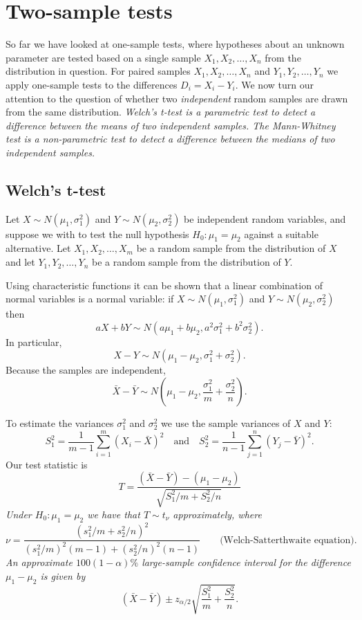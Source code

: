 
\section{Two-sample tests}\label{sec:two-sample-tests}

So far we have looked at one-sample tests, where hypotheses about an unknown parameter are tested based on a single sample $X_1,X_2,\ldots,X_n$ from the distribution in question. For paired samples $X_1,X_2,\ldots,X_n$ and $Y_1,Y_2,\ldots,Y_n$ we apply one-sample tests to the differences $D_i=X_i-Y_i$. We now turn our attention to the question of whether two \emph{independent} random samples are drawn from the same distribution.
\bit
\it \emph{Welch's t-test} is a parametric test to detect a difference between the means of two independent samples.
\it The \emph{Mann-Whitney test} is a non-parametric test to detect a difference between the medians of two independent samples.
\eit
\subsection{Welch's t-test}
Let $X\sim N(\mu_1,\sigma_1^2)$ and $Y\sim N(\mu_2,\sigma_2^2)$ be independent random variables, and suppose we with to test the null hypothesis $H_0:\mu_1=\mu_2$ against a suitable alternative. Let $X_1,X_2,\ldots,X_m$ be a random sample from the distribution of $X$ and let $Y_1,Y_2,\ldots,Y_n$ be a random sample from the distribution of $Y$. 

Using characteristic functions it can be shown that a linear combination of normal variables is a normal variable: if $X\sim N(\mu_1,\sigma_1^2)$ and $Y\sim N(\mu_2,\sigma^2_2)$ then
\[
aX+bY\sim N(a\mu_1+b\mu_2, a^2\sigma_1^2 + b^2\sigma_2^2).
\]
In particular,
\[
X-Y\sim N(\mu_1-\mu_2, \sigma_1^2 + \sigma_2^2).
\]
Because the samples are independent,
\[
\bar{X} - \bar{Y} \sim N\left(\mu_1-\mu_2, \frac{\sigma_1^2}{m} + \frac{\sigma_2^2}{n}\right).
\]

To estimate the variances $\sigma_1^2$ and $\sigma_2^2$ we use the sample variances of $X$ and $Y$:
\[
S_1^2 = \displaystyle\frac{1}{m-1}\sum_{i=1}^m (X_i-\bar{X})^2
\quad\text{and}\quad
S_2^2 = \displaystyle\frac{1}{n-1}\sum_{j=1}^n (Y_j-\bar{Y})^2.
\]
Our test statistic is
\[
T = \frac{(\bar{X}-\bar{Y})-(\mu_1-\mu_2)}{\sqrt{S_1^2/m + S_2^2/n}} %
\]
\bit
\it Under $H_0:\mu_1=\mu_2$ we have that $T\sim t_{\nu}$ approximately, where
\[
\nu = \frac{(s_1^2/m+s_2^2/n)^2}{(s_1^2/m)^2(m-1) + (s_2^2/n)^2(n-1)} \qquad\text{(Welch-Satterthwaite equation).}
\]
\it An approximate $100(1-\alpha)\%$ large-sample confidence interval for the difference $\mu_1-\mu_2$ is given by
\[
(\bar{X}-\bar{Y}) \pm z_{\alpha/2}\sqrt{\frac{S_1^2}{m}+\frac{S_2^2}{n}}.
\]
\eit

